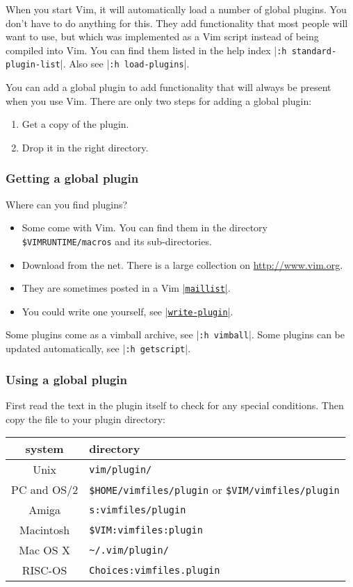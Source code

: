 When you start Vim, it will automatically load a number of global plugins.
You don't have to do anything for this.
They add functionality that most people will want to use, but which was implemented as a Vim script instead of being compiled into Vim.
You can find them listed in the help index |\verb!:h standard-plugin-list!|.
Also see |\verb!:h load-plugins!|.

\label{add-global-plugin}
You can add a global plugin to add functionality that will always be present
when you use Vim.  There are only two steps for adding a global plugin:
\begin{enumerate}
				\item Get a copy of the plugin.
				\item Drop it in the right directory.
\end{enumerate}

\subsubsection{Getting a global plugin}

Where can you find plugins?
\begin{itemize}
				\item Some come with Vim.
								You can find them in the directory \verb!$VIMRUNTIME/macros! and its sub-directories.
				\item Download from the net. There is a large collection on \url{http://www.vim.org}.
				\item They are sometimes posted in a Vim \hyperref[maillist]{|\texttt{maillist}|}.
				\item You could write one yourself, see \hyperref[write-plugin]{|\texttt{write-plugin}|}.
\end{itemize}

Some plugins come as a vimball archive, see |\verb!:h vimball!|.
Some plugins can be updated automatically, see |\verb!:h getscript!|.

\subsubsection{Using a global plugin}

First read the text in the plugin itself to check for any special conditions.
Then copy the file to your plugin directory:

\begin{longtable}{c l}
		system & directory \\ \hline
		Unix & \verb!vim/plugin/! \\
		PC and OS/2 & \verb!$HOME/vimfiles/plugin! or \verb!$VIM/vimfiles/plugin! \\
		Amiga & \verb!s:vimfiles/plugin! \\
		Macintosh & \verb!$VIM:vimfiles:plugin! \\
		Mac OS X & \verb!~/.vim/plugin/! \\
		RISC-OS & \verb!Choices:vimfiles.plugin!
\end{longtable}

